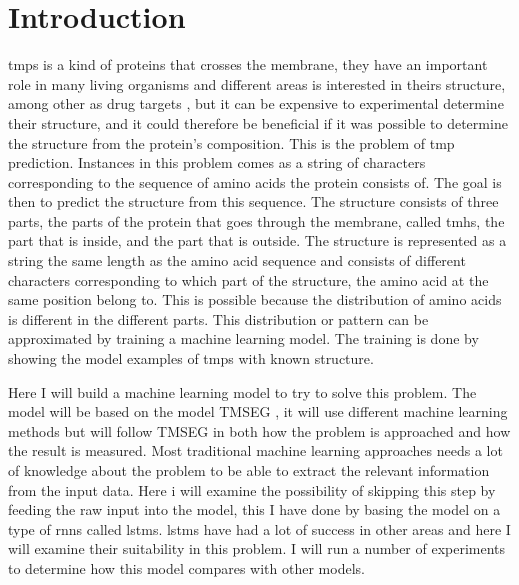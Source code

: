 \section{Introduction}


\glspl{tmp} is a kind of proteins that crosses the membrane, they have an important
role in many living organisms \cite{heijne} and different areas is interested in theirs structure,
among other as drug targets \cite{OveringtonEtAl}, but it can be expensive to experimental determine 
their structure, and it could therefore be beneficial if it was possible to determine
the structure from the protein's composition. This is the problem of \gls{tmp} prediction.
Instances in this problem comes as a string of characters corresponding to the sequence 
of amino acids the protein consists of. The goal is then to predict the structure 
from this sequence. The structure consists of three parts, the parts of the protein 
that goes through the membrane, called \glspl{tmh}, the part that is inside, and the part 
that is outside. The structure is represented as a string the same length as the 
amino acid sequence and consists of different characters corresponding to which part
of the structure, the amino acid at the same position belong to.
This is possible because the distribution of amino acids is different in the different 
parts. This distribution or pattern can be approximated by training a machine learning 
model. The training is done by showing the model examples of \glspl{tmp} with known
structure.

Here I will build a machine learning model to try to solve this problem. The model
will be based on the model TMSEG \cite{tmseg}, it will use different machine learning
methods but will follow TMSEG in both how the problem is approached and how the result
is measured. Most traditional machine learning approaches needs a lot of knowledge 
about the problem to be able to extract the relevant information from the input data.
Here i will examine the possibility of skipping this step by feeding the raw input 
into the model, this I have done by basing the model on a type of \glspl{rnn} called 
\glspl{lstm}. \glspl{lstm} have had a lot of success in other areas and here I will 
examine their suitability in this problem. I will run a number of experiments to determine
how this model compares with other models. 